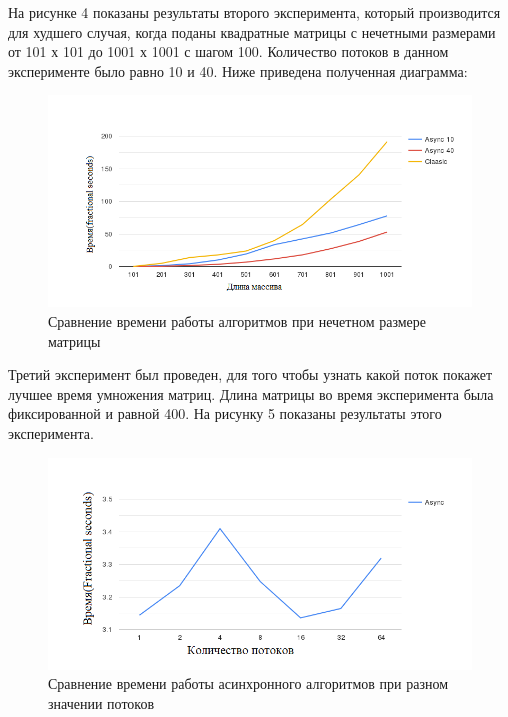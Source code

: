 \documentclass[a4paper, 12pt]{article}
\begin{document}
\begin{flushleft}
	\hspace*{5mm} На рисунке 4 показаны результаты второго эксперимента, который производится для худшего случая, когда поданы квадратные матрицы с нечетными размерами от 101 х 101 до 1001 х 1001 с шагом 100. Количество потоков в данном эксперименте было равно 10 и 40. Ниже приведена полученная диаграмма:
	\clearpage
	\newpage 
	\begin{figure}[h]
		\centering \includegraphics[scale=2]{odd}
		\centering\caption{Сравнение времени работы алгоритмов при нечетном размере матрицы}
	\end{figure}
	Третий эксперимент был проведен, для того чтобы узнать какой поток покажет лучшее время умножения матриц. Длина матрицы во время эксперимента была фиксированной и равной 400. На рисунку 5 показаны результаты этого эксперимента.
	\begin{figure}[h!]
		\centering \includegraphics[scale=2]{chart}
		\centering\caption{Сравнение времени работы асинхронного алгоритмов при разном значении потоков}
	\end{figure}
	\clearpage
	\newpage

\end{flushleft}
\end{document}
